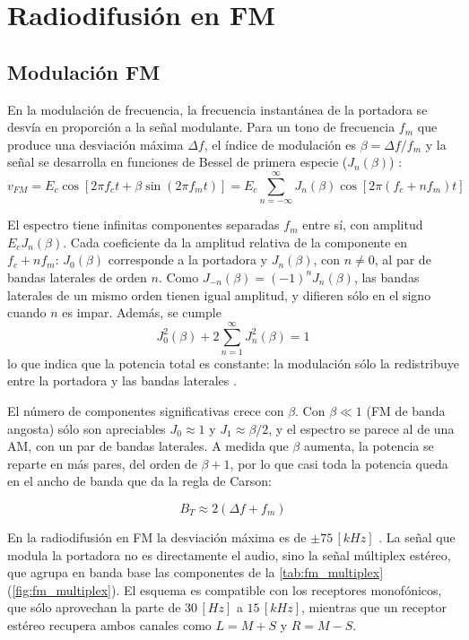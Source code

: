 \section{Radiodifusión en FM}
\label{sec:fm}

\subsection{Modulación FM}
En la modulación de frecuencia, la frecuencia instantánea de la portadora se desvía en proporción a la señal modulante. Para un tono de frecuencia $f_m$ que produce una desviación máxima $\Delta f$, el índice de modulación es $\beta = \Delta f / f_m$ y la señal se desarrolla en funciones de Bessel de primera especie ($J_n(\beta)$) \cite{haykin}:
\begin{equation}
    v_{FM} = E_c \cos\left[2\pi f_c t + \beta \sin(2\pi f_m t)\right]
    = E_c \sum_{n=-\infty}^{\infty} J_n(\beta) \cos\left[2\pi (f_c + n f_m) t\right]
    \label{eq:fm}
\end{equation}

El espectro tiene infinitas componentes separadas $f_m$ entre sí, con amplitud $E_c J_n(\beta)$. Cada coeficiente da la amplitud relativa de la componente en $f_c + n f_m$: $J_0(\beta)$ corresponde a la portadora y $J_n(\beta)$, con $n \neq 0$, al par de bandas laterales de orden $n$. Como $J_{-n}(\beta) = (-1)^n J_n(\beta)$, las bandas laterales de un mismo orden tienen igual amplitud, y difieren sólo en el signo cuando $n$ es impar. Además, se cumple
\begin{equation}
    J_0^2(\beta) + 2 \sum_{n=1}^{\infty} J_n^2(\beta) = 1
\end{equation}
lo que indica que la potencia total es constante: la modulación sólo la redistribuye entre la portadora y las bandas laterales \cite{haykin}.

El número de componentes significativas crece con $\beta$. Con $\beta \ll 1$ (FM de banda angosta) sólo son apreciables $J_0 \approx 1$ y $J_1 \approx \beta/2$, y el espectro se parece al de una AM, con un par de bandas laterales. A medida que $\beta$ aumenta, la potencia se reparte en más pares, del orden de $\beta + 1$, por lo que casi toda la potencia queda en el ancho de banda que da la regla de Carson:

\begin{equation}
    B_T \approx 2 \left(\Delta f + f_m\right)
    \label{eq:carson}
\end{equation}

En la radiodifusión en FM la desviación máxima es de $\pm 75 \, [kHz]$ \cite{itu_bs450}. La señal que modula la portadora no es directamente el audio, sino la señal múltiplex estéreo, que agrupa en banda base las componentes de la \autoref{tab:fm_multiplex} (\autoref{fig:fm_multiplex}). El esquema es compatible con los receptores monofónicos, que sólo aprovechan la parte de $30 \, [Hz]$ a $15 \, [kHz]$, mientras que un receptor estéreo recupera ambos canales como $L = M + S$ y $R = M - S$.

